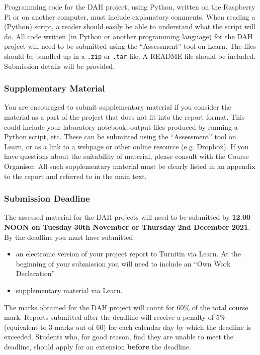Programming code for the DAH project, using Python, written on the Raspberry Pi or on another computer, must include explanatory comments.
When reading a (Python) script, a reader should easily be able to understand what the script will do.
All code written (in Python or another programming language) for the DAH project will need to be submitted using the ``Assessment'' tool on Learn.
The files should be bundled up in a \texttt{.zip} or \texttt{.tar} file.
A README file should be included.
Submission details will be provided.

\subsubsection{Supplementary Material}

You are encouraged to submit supplementary material if you consider the material as a part of the project that does not fit into the report format. 
This could include your laboratory notebook, output files produced by running a Python script, etc.
These can be submitted using the ``Assessment'' tool on Learn, or as a link to a webpage or other online resource (e.g. Dropbox).
If you have questions about the suitability of material, please consult with the Course Organiser.
All such supplementary material must be clearly listed in an appendix to the report and referred to in the main text. 

\subsubsection{Submission Deadline}

The assessed material for the DAH projects will need to be submitted by {\bf 12.00 NOON on Tuesday 30th November or Thursday 2nd December 2021}.
By the deadline you must have submitted
\begin{itemize}
\item an electronic version of your project report to Turnitin via Learn. At the beginning of your submission you will need to include an ``Own Work Declaration''
\item supplementary material via Learn. %
\end{itemize}
The marks obtained for the DAH project will count for 60\% of the total course mark. 
Reports submitted after the deadline will receive a penalty of 5\% (equivalent to 3 marks out of 60) for each calendar day by which the deadline is exceeded.
Students who, for good reason, find they are unable to meet the deadline, should apply for an extension {\bf before} the deadline.

